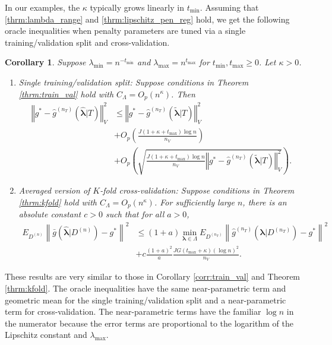 \documentclass[12pt]{article} %
\newtheorem{corollary}{Corollary}
\theoremstyle{definition}
\begin{document}
In our examples, the $\kappa$ typically grows linearly in $t_{\min}$. Assuming that \eqref{thrm:lambda_range} and \eqref{thrm:lipschitz_pen_reg} hold, we get the following oracle inequalities when penalty parameters are tuned via a single training/validation split and cross-validation.
\begin{corollary}
	\label{corr:penalized_reg}
	Suppose $\lambda_{\min} = n^{-t_{\min}}$ and $\lambda_{\max} = n^{t_{\max}}$ for $t_{\min}, t_{\max} \ge 0$. Let $\kappa  > 0$.
	
	\begin{enumerate}
		\item Single training/validation split: Suppose conditions in Theorem \ref{thrm:train_val} hold with $C_\Lambda = O_p (n^\kappa)$. Then
		\begin{align*}
		\left\Vert g^* - \hat{g}^{(n_T)}( \hat{\boldsymbol{\lambda}} | T) \right\Vert _{V}^2
		&\le \left\Vert g^* - \hat{g}^{(n_T)}( \tilde{\boldsymbol{\lambda}} | T) \right \Vert^2_{V}\\
		& + O_p \left(\frac{J (1 + \kappa + t_{\max})\log n}{n_{V}} \right) 
		\\
		& + O_p \left(
		\sqrt{
			\frac{J (1 + \kappa + t_{\max})\log n}{n_{V}}
			\left\Vert g^* - \hat{g}^{(n_T)}( \tilde{\boldsymbol{\lambda}}| T) \right \Vert^2_{V}
		}
		\right ).
		\end{align*}
		
		\item Averaged version of $K$-fold cross-validation: Suppose conditions in Theorem \ref{thrm:kfold}  hold with $C_\Lambda = O_p(n^\kappa)$. For sufficiently large $n$, there is an absolute constant $c > 0$ such that for all $a > 0$,
		\begin{align*}
			E_{D^{(n)}} \left \| \bar{g} ( \hat{\boldsymbol \lambda} | {D^{(n)}} ) - g^* \right \|^2 &\le
			(1+a) \min_{\boldsymbol{\lambda} \in \Lambda}  E_{D^{(n_T)}} \left \| \hat{g}^{(n_T)}(\boldsymbol \lambda | D^{(n_T)}) - g^* \right \|^2 \\
			& + c \frac{(1+a)^2}{a} 
			\frac{JG (t_{\max} + \kappa) (\log n)^2 }{n_V}. 
		\end{align*}
	\end{enumerate}
\end{corollary}
These results are very similar to those in Corollary \ref{corr:train_val} and Theorem \ref{thrm:kfold}. The oracle inequalities have the same near-parametric term and geometric mean for the single training/validation split and a near-parametric term for cross-validation. The near-parametric terms have the familiar $\log n$ in the numerator because the error terms are proportional to the logarithm of the Lipschitz constant and $\lambda_{\max}$. 
\end{document}
